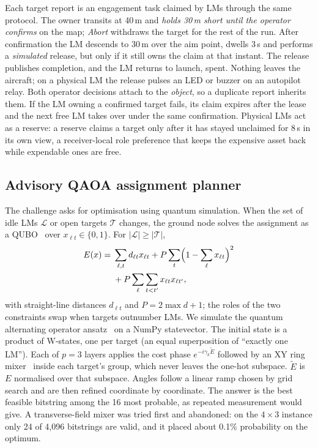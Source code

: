\documentclass[conference]{IEEEtran}
\begin{document}
Each target report is an engagement task claimed by LMs through the same
protocol. The owner transits at 40\,m and \emph{holds 30\,m short until the
operator confirms} on the map; \emph{Abort} withdraws the target for the rest
of the run. After confirmation the LM descends to 30\,m over the aim point,
dwells 3\,s and performs a \emph{simulated} release, but only if it still owns
the claim at that instant. The release publishes completion, and the LM
returns to launch, spent. Nothing leaves the aircraft; on a physical LM the
release pulses an LED or buzzer on an autopilot relay. Both operator
decisions attach to the \emph{object}, so a duplicate report inherits them. If
the LM owning a confirmed target fails, its claim expires after the lease and
the next free LM takes over under the same confirmation. Physical LMs act as
a reserve: a reserve claims a target only after it has stayed unclaimed for
8\,s in its own view, a receiver-local role preference that keeps the
expensive asset back while expendable ones are free.

\subsection{Advisory QAOA assignment planner}
\label{sec:qaoa}

The challenge asks for optimisation using quantum simulation. When the set of
idle LMs $\mathcal{L}$ or open targets $\mathcal{T}$ changes, the ground node
solves the assignment as a QUBO~\cite{lucas2014ising} over
$x_{\ell t}\in\{0,1\}$. For $|\mathcal{L}|\ge|\mathcal{T}|$,
\begin{equation}
\begin{split}
  E(x) ={}& \sum_{\ell,t} d_{\ell t}x_{\ell t}
  + P\sum_{t}\Bigl(1-\sum_{\ell}x_{\ell t}\Bigr)^{2}\\
  &+ P\sum_{\ell}\sum_{t<t'}x_{\ell t}x_{\ell t'},
\end{split}
  \label{eq:qubo}
\end{equation}
with straight-line distances $d_{\ell t}$ and $P=2\max d+1$; the roles of the
two constraints swap when targets outnumber LMs. We simulate the quantum
alternating operator ansatz~\cite{hadfield2019qaoa} on a NumPy statevector.
The initial state is a product of W-states, one per target (an equal
superposition of ``exactly one LM''). Each of $p=3$ layers applies the cost
phase $e^{-i\gamma_k\tilde E}$ followed by an XY ring
mixer~\cite{wang2020xy} inside each target's group, which never leaves the
one-hot subspace. $\tilde E$ is $E$ normalised over that subspace. Angles
follow a linear ramp chosen by grid search and are then refined coordinate by
coordinate. The answer is the best feasible bitstring among the 16 most
probable, as repeated measurement would give. A transverse-field mixer was
tried first and abandoned: on the $4\times3$ instance only 24 of 4,096
bitstrings are valid, and it placed about 0.1\% probability on the optimum.
\end{document}
